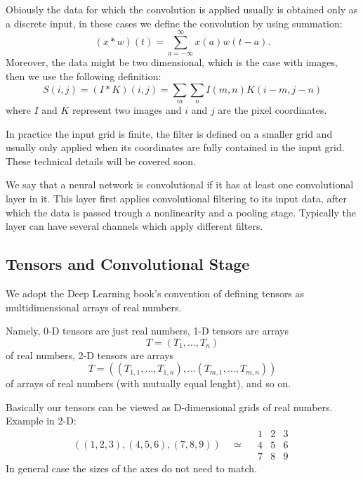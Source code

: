 \documentclass[]{article}
\begin{document}
Obiously the data for which the convolution is applied usually is obtained only
as a discrete input, in these cases we define the convolution by using
summation:
\[
(x * w)(t) = \sum_{a = -\infty}^{\infty} x(a)w(t - a).
\]
Moreover, the data might be two dimensional, which is the case with images, then
we use the following definition:
\[
S(i, j) = (I * K)(i, j) = \sum_m \sum_n I(m , n) K(i - m, j - n)
\]
where $I$ and $K$ represent two images and $i$ and $j$ are the pixel coordinates.

In practice the input grid is finite, the filter is defined on a smaller grid and
usually only applied when its coordinates are fully contained in the input grid.
These technical details will be covered soon.

We say that a neural network is convolutional if it has at least one convolutional
layer in it. This layer first applies convolutional filtering to its input data,
after which the data is passed trough a nonlinearity and a pooling stage. Typically
the layer can have several channels which apply different filters.

\subsection{Tensors and Convolutional Stage}
We adopt the Deep Learning book's convention of defining tensors as
multidimensional arrays of real numbers.

Namely, 0-D tensors are just real numbers, 1-D tensors are arrays
\[
T = (T_1, \ldots, T_n)
\]
of real numbers, 2-D tensors are arrays
\[
T = ((T_{1,1}, \ldots, T_{1,n}), \ldots (T_{m,1}, \ldots, T_{m,n}))
\]
of arrays of real numbers (with mutually equal lenght), and so on.

Basically our tensors can be viewed as D-dimensional grids of real numbers.
Example in 2-D:
\[
((1, 2, 3), (4, 5, 6), (7, 8, 9)) \quad \simeq \quad
\begin{array}{c|c|c}
  1 & 2 & 3 \\
  \hline
  4 & 5 & 6 \\
  \hline
  7 & 8 & 9
 \end{array}
\]
In general case the sizes of the axes do not need to match.
\end{document}
